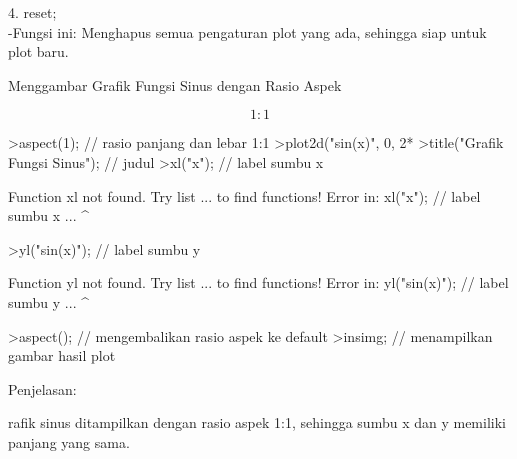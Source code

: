 \documentclass{article}
\begin{document}
\begin{eulernotebook}
\begin{eulercomment}
\begin{eulercomment}
\begin{eulercomment}
\begin{eulercomment}
\begin{eulercomment}
4. reset;\\
-Fungsi ini: Menghapus semua pengaturan plot yang ada, sehingga siap
untuk plot baru.


\end{eulercomment}
\begin{eulercomment}
Menggambar Grafik Fungsi Sinus dengan Rasio Aspek\\
\end{eulercomment}
\begin{eulerformula}
\[
1:1
\]
\end{eulerformula}
\begin{eulercomment}
\end{eulercomment}
\begin{eulerprompt}
>aspect(1); // rasio panjang dan lebar 1:1
>plot2d("sin(x)", 0, 2*%
>title("Grafik Fungsi Sinus"); // judul
>xl("x"); // label sumbu x
\end{eulerprompt}
\begin{euleroutput}
  Function xl not found.
  Try list ... to find functions!
  Error in:
  xl("x"); // label sumbu x ...
         ^
\end{euleroutput}
\begin{eulerprompt}
>yl("sin(x)"); // label sumbu y
\end{eulerprompt}
\begin{euleroutput}
  Function yl not found.
  Try list ... to find functions!
  Error in:
  yl("sin(x)"); // label sumbu y ...
              ^
\end{euleroutput}
\begin{eulerprompt}
>aspect(); // mengembalikan rasio aspek ke default
>insimg; // menampilkan gambar hasil plot
\end{eulerprompt}
\begin{eulercomment}
Penjelasan:

rafik sinus ditampilkan dengan rasio aspek 1:1, sehingga sumbu x dan y
memiliki panjang yang sama.


\end{eulercomment}
\end{eulercomment}
\end{eulercomment}
\end{eulercomment}
\end{eulercomment}
\end{eulernotebook}
\end{document}
